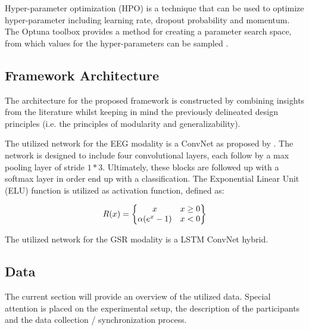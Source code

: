 \documentclass{article}
\begin{document}
Hyper-parameter optimization (HPO) is a technique that can be used to optimize hyper-parameter including learning rate, dropout probability and momentum. The Optuna toolbox provides a method for creating a parameter search space, from which values for the hyper-parameters can be sampled \cite{akiba2019optuna}. 

\subsection{Framework Architecture}
The architecture for the proposed framework is constructed by combining insights from the literature whilst keeping in mind the previously delineated design principles (i.e. the principles of modularity and generalizability). 

The utilized network for the EEG modality is a ConvNet as proposed by . The network is designed to include four convolutional layers, each follow by a max pooling layer of stride $1* 3$. Ultimately, these blocks are followed up with a softmax layer in order end up with a classification. The Exponential Linear Unit (ELU) function is utilized as activation function, defined as: 

\begin{equation}
R(x)= 
\begin{Bmatrix}
x & x \geq0 \\ 
\alpha (e^x -1) & x<0
\end{Bmatrix}
\bigskip
\end{equation}


The utilized network for the GSR modality is a LSTM ConvNet hybrid.  


\subsection{Data}
The current section will provide an overview of the utilized data. Special attention is placed on the experimental setup, the description of the participants and the data collection / synchronization process. 
\end{document}
